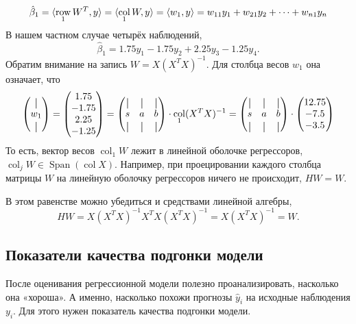 \documentclass[12pt]{article}
\DeclareMathOperator{\col}{col}
\DeclareMathOperator{\row}{row}
\DeclareMathOperator{\Span}{Span}
\DeclarePairedDelimiter{\scalp}{\langle}{\rangle}
\newcommand*{\vertbar}{\rule[-1ex]{0.5pt}{2.5ex}}
\newcommand{\hb}{\hat{\beta}}
\newcommand{\hy}{\hat{y}}
\begin{document}
\[
\hb_1 = \scalp{\row_1 W^T, y} = \scalp{\col_1 W, y} = \scalp{w_1, y}  = w_{11}y_1 + w_{21} y_2 + \dots + w_{n1} y_n 
\]
В нашем частном случае четырёх наблюдений,
\[
\hb_1 = 1.75 y_1 - 1.75 y_2 + 2.25y_3 - 1.25 y_4.
\]
Обратим внимание на запись $W = X(X^TX)^{-1}$.
Для столбца весов $w_1$ она означает, что
\[
\begin{pmatrix}
    \vertbar \\
    w_1 \\
    \vertbar
\end{pmatrix} =
\begin{pmatrix}
    1.75 \\
    -1.75 \\
    2.25 \\
    -1.25
\end{pmatrix} =
\begin{pmatrix}
    \vertbar & \vertbar & \vertbar \\
    s & a & b \\
    \vertbar & \vertbar & \vertbar \\    
\end{pmatrix} \cdot \col_1 (X^TX)^{-1} = 
\begin{pmatrix}
    \vertbar & \vertbar & \vertbar \\
    s & a & b \\
    \vertbar & \vertbar & \vertbar \\    
\end{pmatrix} \cdot \begin{pmatrix}
    12.75 \\
    -7.5 \\
    -3.5 \\
\end{pmatrix}
\]
То есть, вектор весов $\col_1 W$ лежит в линейной оболочке регрессоров, $\col_j W \in  \Span(\col X)$.
Например, при проецировании каждого столбца матрицы $W$ на линейную оболочку регрессоров ничего не происходит, $HW = W$.

В этом равенстве можно убедиться и средствами линейной алгебры,
\[
HW = X(X^TX)^{-1} X^T X(X^TX)^{-1} = X(X^TX)^{-1} = W.
\]


\subsection{Показатели качества подгонки модели}

После оценивания регрессионной модели полезно проанализировать, насколько она «хороша». 
А именно, насколько похожи прогнозы $\hy_i$ на исходные наблюдения $y_i$.
Для этого нужен показатель качества подгонки модели.
\end{document}
